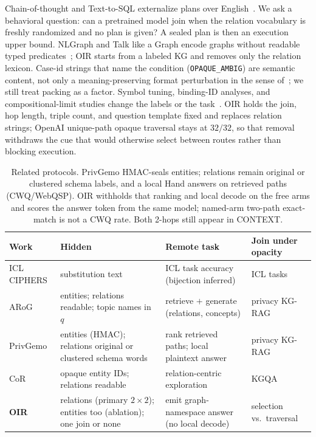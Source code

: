 \documentclass[10pt]{article} %
\begin{document}
Chain-of-thought and Text-to-SQL externalize plans over
English~\citep{wei2022cot,yu2018spider}.
We ask a behavioral question: can a pretrained model join when the relation
vocabulary is freshly randomized and no plan is given? A sealed plan is then
an execution upper bound.
NLGraph and Talk like a Graph encode graphs without readable typed
predicates~\citep{wang2023nlgraph,fatemi2024talk}; OIR starts from a labeled
KG and removes only the relation lexicon.
Case-id strings that name the condition (\texttt{OPAQUE\_AMBIG}) are
semantic content, not only a meaning-preserving format perturbation in the
sense of~\citet{sclar2024spurious}; we still treat packing as a factor.
Symbol tuning, binding-ID analyses, and compositional-limit studies change
the labels or the task~\citep{wei2023symbol,feng2024binding,dziri2023faith}.
OIR holds the join, hop length, triple count, and question template fixed and
replaces relation strings; OpenAI unique-path opaque traversal stays at
$32/32$, so that removal withdraws the cue that would otherwise select
between routes rather than blocking execution.

\begin{table}[t]
\centering
\small
\setlength{\tabcolsep}{3.2pt}

\caption{Related protocols. PrivGemo HMAC-seals entities; relations remain
original or clustered schema labels, and a local Hand answers on retrieved
paths (CWQ/WebQSP). OIR withholds that ranking and local decode on the free
arms and scores the answer token from the same model; named-arm two-path
exact-match is not a CWQ rate. Both 2-hops still appear in CONTEXT.}
\label{tab:diff}
\begin{tabular}{@{}>{\raggedright\arraybackslash}p{1.55cm}
                 >{\raggedright\arraybackslash}p{2.55cm}
                 >{\raggedright\arraybackslash}p{2.85cm}
                 >{\raggedright\arraybackslash}p{2.85cm}@{}}
\toprule
Work & Hidden & Remote task & Join under opacity \\
\midrule
ICL CIPHERS & substitution text & ICL task accuracy (bijection inferred) & ICL tasks \\
ARoG & entities; relations readable; topic names in $q$ & retrieve $+$ generate (relations, concepts) & privacy KG-RAG \\
PrivGemo & entities (HMAC); relations original or clustered schema words & rank retrieved paths; local plaintext answer & privacy KG-RAG \\
CoR & opaque entity IDs; relations readable & relation-centric exploration & KGQA \\
\textbf{OIR} & relations (primary $2{\times}2$); entities too (ablation); one join or none & emit graph-namespace answer (no local decode) & selection vs.\ traversal \\
\bottomrule
\end{tabular}

\end{table}
\FloatBarrier
\end{document}
